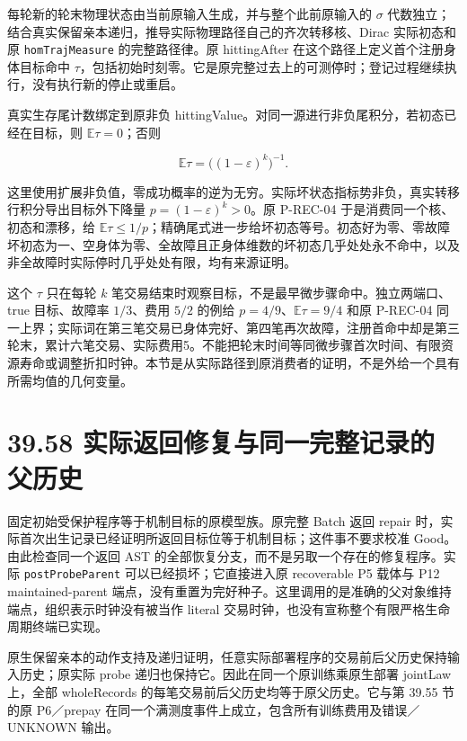 \documentclass[
  11pt,
  oneside]{book}
\begin{document}
每轮新的轮末物理状态由当前原输入生成，并与整个此前原输入的 \(\sigma\) 代数独立；结合真实保留亲本递归，推导实际物理路径自己的齐次转移核、Dirac 实际初态和原 \nolinkurl{homTrajMeasure} 的完整路径律。原 hittingAfter 在这个路径上定义首个注册身体目标命中 \(\tau\)，包括初始时刻零。它是原完整过去上的可测停时；登记过程继续执行，没有执行新的停止或重启。

真实生存尾计数绑定到原非负 hittingValue。对同一源进行非负尾积分，若初态已经在目标，则 \(\mathbb E\tau=0\)；否则

\[\mathbb E\tau=\bigl((1-\varepsilon)^k\bigr)^{-1}.\]

这里使用扩展非负值，零成功概率的逆为无穷。实际坏状态指标势非负，真实转移行积分导出目标外下降量 \(p=(1-\varepsilon)^k>0\)。原 P-REC-04 于是消费同一个核、初态和漂移，给 \(\mathbb E\tau\le1/p\)；精确尾式进一步给坏初态等号。初态好为零、零故障坏初态为一、空身体为零、全故障且正身体维数的坏初态几乎处处永不命中，以及非全故障时实际停时几乎处处有限，均有来源证明。

这个 \(\tau\) 只在每轮 \(k\) 笔交易结束时观察目标，不是最早微步骤命中。独立两端口、true 目标、故障率 \(1/3\)、费用 \(5/2\) 的例给 \(p=4/9\)、\(\mathbb E\tau=9/4\) 和原 P-REC-04 同一上界；实际词在第三笔交易已身体完好、第四笔再次故障，注册首命中却是第三轮末，累计六笔交易、实际费用5。不能把轮末时间等同微步骤首次时间、有限资源寿命或调整折扣时钟。本节是从实际路径到原消费者的证明，不是外给一个具有所需均值的几何变量。

\section{39.58 实际返回修复与同一完整记录的父历史}\label{ux5b9eux9645ux8fd4ux56deux4feeux590dux4e0eux540cux4e00ux5b8cux6574ux8bb0ux5f55ux7684ux7236ux5386ux53f2}

固定初始受保护程序等于机制目标的原模型族。原完整 Batch 返回 repair 时，实际首次出生记录已经证明所返回目标位等于机制目标；这件事不要求校准 Good。由此检查同一个返回 AST 的全部恢复分支，而不是另取一个存在的修复程序。实际 \nolinkurl{postProbeParent} 可以已经损坏；它直接进入原 recoverable P5 载体与 P12 maintained-parent 端点，没有重置为完好种子。这里调用的是准确的父对象维持端点，组织表示时钟没有被当作 literal 交易时钟，也没有宣称整个有限严格生命周期终端已实现。

原生保留亲本的动作支持及递归证明，任意实际部署程序的交易前后父历史保持输入历史；原实际 probe 递归也保持它。因此在同一个原训练乘原生部署 jointLaw 上，全部 wholeRecords 的每笔交易前后父历史均等于原父历史。它与第 39.55 节的原 P6／prepay 在同一个满测度事件上成立，包含所有训练费用及错误／UNKNOWN 输出。
\end{document}
